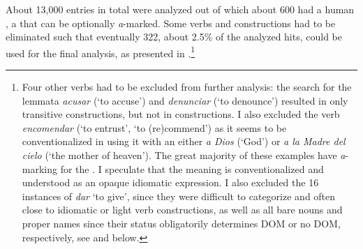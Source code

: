 \documentclass[output=paper]{LSP/langsci}
\begin{document}
\begin{table}
\caption{Sample analysis for \textit{presenter} ‘to present’ for the 17th century in the Corpus del Español}
\label{11-he-tab:9}
\end{table}

\newpage 
About 13,000 entries in total were analyzed out of which about 600 had a human , \ie a  that can be optionally \textit{a}-marked. Some verbs and constructions had to be eliminated such that eventually 322, \ie about 2.5\% of the analyzed hits, could be used for the final analysis, as presented in .\footnote{Four other verbs had to be excluded from further analysis: the search for the lemmata \textit{acusar} (‘to accuse’) and \textit{denunciar} (‘to denounce’) resulted in only transitive constructions, but not in  constructions. I also excluded the verb \textit{encomendar} (‘to entrust’, ‘to (re)commend’) as it seems to be conventionalized in using it with an  either \textit{a Dios} (‘God’) or \textit{a la Madre del cielo} (‘the mother of heaven’). The great majority of these examples have \textit{a}-marking for the . I speculate that the meaning is conventionalized and understood as an opaque idiomatic expression. I also excluded the 16 instances of \textit{dar} ‘to give’, since they were difficult to categorize and often close to idiomatic or light verb constructions, as well as all bare nouns and proper names since their  status obligatorily determines DOM or no DOM, respectively, see  and  below.}
\end{document}

